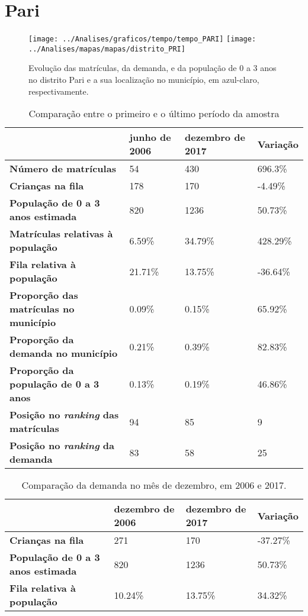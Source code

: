 \section{Pari}
\begin{figure}[H]
\centering
\texttt{[image: ../Analises/graficos/tempo/tempo\_PARI]}
\texttt{[image: ../Analises/mapas/mapas/distrito\_PRI]}
\caption{Evolução das matrículas, da demanda, e da população de 0 a 3 anos no distrito Pari e a sua localização no município, em azul-claro, respectivamente.}
\end{figure}
\begin{table}[H]
\begin{tabular}{l|l|l|l}
\textbf{}                                      & \textbf{junho de 2006}       & \textbf{dezembro de 2017}    & \textbf{Variação} \\ \hline
\textbf{Número de matrículas}                  & 54 & 430 & 696.3\% \\ \hline
\textbf{Crianças na fila}                      & 178 & 170 & -4.49\% \\ \hline
\textbf{População de 0 a 3 anos estimada}      & 820 & 1236 & 50.73\% \\ \hline
\textbf{Matrículas relativas à população}      & 6.59\% & 34.79\% & 428.29\% \\ \hline
\textbf{Fila relativa à população}             & 21.71\% & 13.75\% & -36.64\% \\ \hline
\textbf{Proporção das matrículas no município} & 0.09\% & 0.15\% & 65.92\% \\ \hline
\textbf{Proporção da demanda no município}     & 0.21\% & 0.39\% & 82.83\% \\ \hline
\textbf{Proporção da população de 0 a 3 anos}  & 0.13\% & 0.19\% & 46.86\% \\ \hline
\textbf{Posição no \textit{ranking} das matrículas}     & 94 & 85 & 9 \\ \hline
\textbf{Posição no \textit{ranking} da demanda}         & 83 & 58 & 25 \\ 
\end{tabular}
\caption{Comparação entre o primeiro e o último período da amostra}
\end{table}
\begin{table}[H]
\begin{tabular}{l|l|l|l}
\textbf{}                                 & \textbf{dezembro de 2006} & \textbf{dezembro de 2017} & \textbf{Variação} \\ \hline
\textbf{Crianças na fila}                      & 271 & 170 & -37.27\% \\ \hline
\textbf{População de 0 a 3 anos estimada}      & 820 & 1236 & 50.73\% \\ \hline
\textbf{Fila relativa à população}             & 10.24\% & 13.75\% & 34.32\% \\
\end{tabular}
\caption{Comparação da demanda no mês de dezembro, em 2006 e 2017.}
\end{table}
